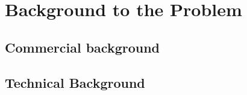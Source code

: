 \section{Background to the Problem}
\subsection{Commercial background}
\subsection{Technical Background}
